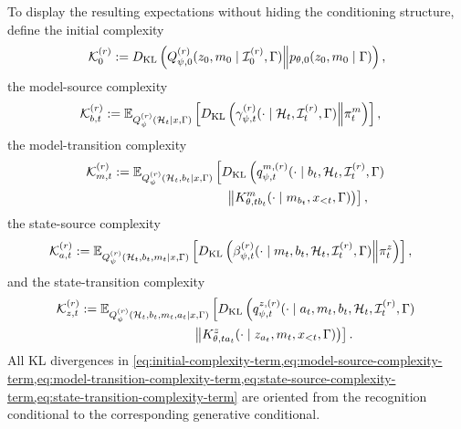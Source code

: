 To display the resulting expectations without hiding the conditioning structure, define the initial complexity
\begin{equation}
\mathcal K_0^{(r)}
:=D_{\mathrm{KL}}\left(
Q_{\psi,0}^{(r)}(z_0,m_0\mid\mathcal I_0^{(r)},\Gamma)
\middle\Vert
p_{\theta,0}(z_0,m_0\mid\Gamma)
\right),
\label{eq:initial-complexity-term}
\end{equation}
the model-source complexity
\begin{equation}
\begin{aligned}
\mathcal K_{b,t}^{(r)}
:={}&\mathbb E_{Q_\psi^{(r)}(\mathcal H_t\mid x,\Gamma)}
\left[
D_{\mathrm{KL}}\left(
\gamma_{\psi,t}^{(r)}
(\mathord{\cdot}\mid\mathcal H_t,\mathcal I_t^{(r)},\Gamma)
\middle\Vert
\pi_t^m
\right)
\right],
\end{aligned}
\label{eq:model-source-complexity-term}
\end{equation}
the model-transition complexity
\begin{equation}
\begin{aligned}
\mathcal K_{m,t}^{(r)}
:={}&\mathbb E_{Q_\psi^{(r)}
(\mathcal H_t,b_t\mid x,\Gamma)}
\left[
D_{\mathrm{KL}}\left(
q_{\psi,t}^{m,(r)}
(\mathord{\cdot}\mid b_t,\mathcal H_t,
\mathcal I_t^{(r)},\Gamma)
\right.\right.\\
&\left.\left.\hspace{7em}\middle\Vert
K^m_{\theta,tb_t}
(\mathord{\cdot}\mid m_{b_t},x_{<t},\Gamma)
\right)
\right],
\end{aligned}
\label{eq:model-transition-complexity-term}
\end{equation}
the state-source complexity
\begin{equation}
\begin{aligned}
\mathcal K_{a,t}^{(r)}
:={}&\mathbb E_{Q_\psi^{(r)}
(\mathcal H_t,b_t,m_t\mid x,\Gamma)}
\left[
D_{\mathrm{KL}}\left(
\beta_{\psi,t}^{(r)}
(\mathord{\cdot}\mid m_t,b_t,\mathcal H_t,
\mathcal I_t^{(r)},\Gamma)
\middle\Vert
\pi_t^z
\right)
\right],
\end{aligned}
\label{eq:state-source-complexity-term}
\end{equation}
and the state-transition complexity
\begin{equation}
\begin{aligned}
\mathcal K_{z,t}^{(r)}
:={}&\mathbb E_{Q_\psi^{(r)}
(\mathcal H_t,b_t,m_t,a_t\mid x,\Gamma)}
\left[
D_{\mathrm{KL}}\left(
q_{\psi,t}^{z,(r)}
(\mathord{\cdot}\mid a_t,m_t,b_t,\mathcal H_t,
\mathcal I_t^{(r)},\Gamma)
\right.\right.\\
&\left.\left.\hspace{7em}\middle\Vert
K^z_{\theta,ta_t}
(\mathord{\cdot}\mid z_{a_t},m_t,x_{<t},\Gamma)
\right)
\right].
\end{aligned}
\label{eq:state-transition-complexity-term}
\end{equation}
All KL divergences in \cref{eq:initial-complexity-term,eq:model-source-complexity-term,eq:model-transition-complexity-term,eq:state-source-complexity-term,eq:state-transition-complexity-term} are oriented from the recognition conditional to the corresponding generative conditional.

